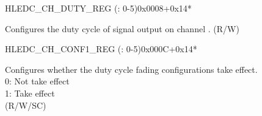     \begin{register}{H}{LEDC\_CH\_DUTY\_REG (: 0-5)}{0x0008+0x14*}\label{regdesc:LEDCCHNDUTYREG}
    \regnewline%
    \begin{regdesc}\begin{reglist}
    \label{fielddesc:LEDCDUTYCHN}\item [LEDC\_DUTY\_CH\regindex{n}] Configures the duty cycle of signal output on channel . (R/W)
    \end{reglist}\end{regdesc}
    \end{register}


    \begin{register}{H}{LEDC\_CH\_CONF1\_REG (: 0-5)}{0x000C+0x14*}\label{regdesc:LEDCCHNCONF1REG}
    \regnewline%
    \begin{regdesc}\begin{reglist}
    \label{fielddesc:LEDCDUTYSTARTCHN}\item [LEDC\_DUTY\_START\_CH\regindex{n}] Configures whether the duty cycle fading configurations take effect.\\
    0: Not take effect\\
    1: Take effect \\
    (R/W/SC)
    \end{reglist}\end{regdesc}
    \end{register}



